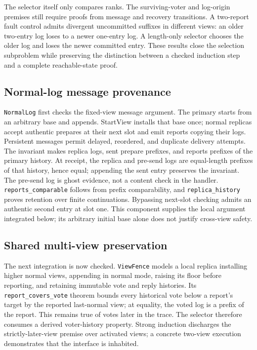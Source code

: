 \documentclass[10pt,journal,letterpaper]{IEEEtran}
\begin{document}
The selector itself only compares ranks. The surviving-voter and log-origin
premises still require proofs from message and recovery transitions. A
two-report fault control admits divergent uncommitted suffixes in different
views: an older two-entry log loses to a newer one-entry log. A length-only
selector chooses the older log and loses the newer committed entry. These
results close the selection subproblem while preserving the distinction
between a checked induction step and a complete reachable-state proof.

\subsection{Normal-log message provenance}
\texttt{NormalLog} first checks the fixed-view message argument. The primary
starts from an arbitrary base and appends. StartView installs that base once;
normal replicas accept authentic prepares at their next slot and emit reports
copying their logs. Persistent messages permit delayed, reordered, and duplicate
delivery attempts. The invariant makes replica logs, sent prepare prefixes,
and reports prefixes of the primary history. At receipt, the replica and
pre-send logs are equal-length prefixes of that history, hence equal; appending
the sent entry preserves the invariant. The pre-send log is ghost evidence,
not a content check in the handler. \texttt{reports\_comparable} follows from
prefix comparability, and \texttt{replica\_history} proves retention over finite
continuations. Bypassing next-slot checking admits an authentic second entry
at slot one. This component supplies the local argument integrated below;
its arbitrary initial base alone does not justify cross-view safety.

\subsection{Shared multi-view preservation}
The next integration is now checked. \texttt{ViewFence} models a local replica
installing higher normal views, appending in normal mode, raising its floor
before reporting, and retaining immutable vote and reply histories. Its
\texttt{report\_covers\_vote} theorem bounds every historical vote below a
report's target by the reported last-normal view; at equality, the voted log
is a prefix of the report. This remains true of votes later in the trace.
The selector therefore consumes a derived voter-history property. Strong
induction discharges the strictly-later-view premise over activated views;
a concrete two-view execution demonstrates that the interface is inhabited.
\end{document}
